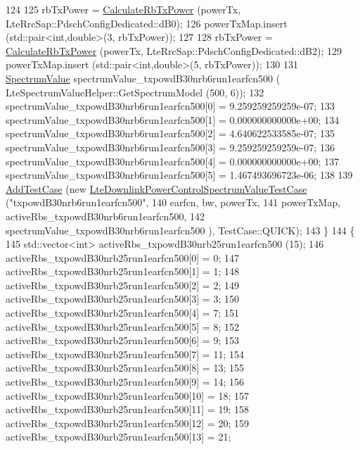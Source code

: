 \begin{DoxyCode}
124 
125     rbTxPower = \hyperlink{classLteDownlinkPowerControlTestSuite_acbda226a1db61d5328141d80aca96447}{CalculateRbTxPower} (powerTx, LteRrcSap::PdschConfigDedicated::dB0);
126     powerTxMap.insert (std::pair<int,double>(3, rbTxPower));
127 
128     rbTxPower = \hyperlink{classLteDownlinkPowerControlTestSuite_acbda226a1db61d5328141d80aca96447}{CalculateRbTxPower} (powerTx, LteRrcSap::PdschConfigDedicated::dB2);
129     powerTxMap.insert (std::pair<int,double>(5, rbTxPower));
130 
131     \hyperlink{classns3_1_1SpectrumValue}{SpectrumValue} spectrumValue\_txpowdB30nrb6run1earfcn500 (
      LteSpectrumValueHelper::GetSpectrumModel (500, 6));
132     spectrumValue\_txpowdB30nrb6run1earfcn500[0] = 9.259259259259e-07;
133     spectrumValue\_txpowdB30nrb6run1earfcn500[1] = 0.000000000000e+00;
134     spectrumValue\_txpowdB30nrb6run1earfcn500[2] = 4.640622533585e-07;
135     spectrumValue\_txpowdB30nrb6run1earfcn500[3] = 9.259259259259e-07;
136     spectrumValue\_txpowdB30nrb6run1earfcn500[4] = 0.000000000000e+00;
137     spectrumValue\_txpowdB30nrb6run1earfcn500[5] = 1.467493696723e-06;
138 
139     \hyperlink{classns3_1_1TestCase_a3718088e3eefd5d6454569d2e0ddd835}{AddTestCase} (\textcolor{keyword}{new} \hyperlink{classLteDownlinkPowerControlSpectrumValueTestCase}{LteDownlinkPowerControlSpectrumValueTestCase}
       (\textcolor{stringliteral}{"txpowdB30nrb6run1earfcn500"},
140                                                                    earfcn, bw, powerTx,
141                                                                    powerTxMap, 
      activeRbs\_txpowdB30nrb6run1earfcn500,
142                                                                    spectrumValue\_txpowdB30nrb6run1earfcn500
      ), TestCase::QUICK);
143   \}
144   \{
145     std::vector<int> activeRbs\_txpowdB30nrb25run1earfcn500 (15);
146     activeRbs\_txpowdB30nrb25run1earfcn500[0] = 0;
147     activeRbs\_txpowdB30nrb25run1earfcn500[1] = 1;
148     activeRbs\_txpowdB30nrb25run1earfcn500[2] = 2;
149     activeRbs\_txpowdB30nrb25run1earfcn500[3] = 3;
150     activeRbs\_txpowdB30nrb25run1earfcn500[4] = 7;
151     activeRbs\_txpowdB30nrb25run1earfcn500[5] = 8;
152     activeRbs\_txpowdB30nrb25run1earfcn500[6] = 9;
153     activeRbs\_txpowdB30nrb25run1earfcn500[7] = 11;
154     activeRbs\_txpowdB30nrb25run1earfcn500[8] = 13;
155     activeRbs\_txpowdB30nrb25run1earfcn500[9] = 14;
156     activeRbs\_txpowdB30nrb25run1earfcn500[10] = 18;
157     activeRbs\_txpowdB30nrb25run1earfcn500[11] = 19;
158     activeRbs\_txpowdB30nrb25run1earfcn500[12] = 20;
159     activeRbs\_txpowdB30nrb25run1earfcn500[13] = 21;

\end{DoxyCode}
